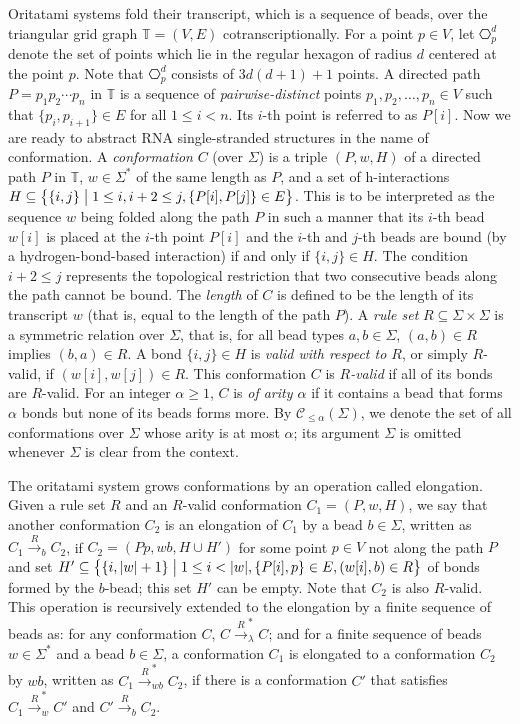 \documentclass[twocolumn]{svjour3}
\begin{document}
Oritatami systems fold their transcript, which is a sequence of beads, over the triangular grid graph $\mathbb{T} = (V, E)$ cotranscriptionally. %
For a point $p \in V$, let $\hexagon_p^d$ denote the set of points which lie in the regular hexagon of radius $d$ centered at the point $p$. 
Note that $\hexagon_p^d$ consists of $3d(d+1)+1$ points. %
A directed path $P = p_1 p_2 \cdots p_n$ in $\mathbb{T}$ is a sequence of \textit{pairwise-distinct} points $p_1, p_2, \ldots, p_n \in V$ such that $\{p_i, p_{i+1}\} \in E$ for all $1 \le i < n$. 
Its $i$-th point is referred to as $P[i]$. 
Now we are ready to abstract RNA single-stranded structures in the name of conformation. 
A \textit{conformation} $C$ (over $\Sigma$) is a triple $(P, w, H)$ of a directed path $P$ in $\mathbb{T}$, $w \in \Sigma^*$ of the same length as $P$, and a set of h-interactions $H \subseteq \bigl\{\{i, j\} \bigm| 1 \le i, i+2 \le j, \{P[i], P[j]\} \in E \bigr\}$. 
This is to be interpreted as the sequence $w$ being folded along the path $P$ in such a manner that its $i$-th bead $w[i]$ is placed at the $i$-th point $P[i]$ and the $i$-th and $j$-th beads are bound (by a hydrogen-bond-based interaction) if and only if $\{i, j\} \in H$. 
The condition $i+2 \le j$ represents the topological restriction that two consecutive beads along the path cannot be bound. 
The \textit{length} of $C$ is defined to be the length of its transcript $w$ (that is, equal to the length of the path $P$). 
A \textit{rule set} $R \subseteq \Sigma \times \Sigma$ is a symmetric relation over $\Sigma$, that is, for all bead types $a, b \in \Sigma$, $(a, b) \in R$ implies $(b, a) \in R$.
A bond $\{i, j\} \in H$ is \textit{valid with respect to $R$}, or simply $R$-valid, if $(w[i], w[j]) \in R$. 
This conformation $C$ is \textit{$R$-valid} if all of its bonds are $R$-valid. %
For an integer $\alpha \ge 1$, $C$ is \textit{of arity $\alpha$} if it contains a bead that forms $\alpha$ bonds but none of its beads forms more. 
By $\mathcal{C}_{\le \alpha}(\Sigma)$, we denote the set of all conformations over $\Sigma$ whose arity is at most $\alpha$; its argument $\Sigma$ is omitted whenever $\Sigma$ is clear from the context. 

The oritatami system grows conformations by an operation called elongation. 
Given a rule set $R$ and an $R$-valid conformation $C_1 = (P, w, H)$, we say that another conformation $C_2$ is an elongation of $C_1$ by a bead $b \in \Sigma$, written as $C_1 \xrightarrow{R}_b C_2$, if $C_2 = (P p, wb, H \cup H')$ for some point $p \in V$ not along the path $P$ and set $H' \subseteq \bigl\{ \{i, |w|+1\} \bigm| 1 \le i < |w|, \{P[i], p\} \in E, (w[i], b) \in R \bigr\}$ of bonds formed by the $b$-bead; this set $H'$ can be empty. 
Note that $C_2$ is also $R$-valid. 
This operation is recursively extended to the elongation by a finite sequence of beads as: for any conformation $C$, $C \xrightarrow{R}_\lambda^* C$; and for a finite sequence of beads $w \in \Sigma^*$ and a bead $b \in \Sigma$, a conformation $C_1$ is elongated to a conformation $C_2$ by $wb$, written as $C_1 \xrightarrow{R}_{wb}^* C_2$, if there is a conformation $C'$ that satisfies $C_1 \xrightarrow{R}_w^* C'$ and $C' \xrightarrow{R}_b C_2$. 
\end{document}
